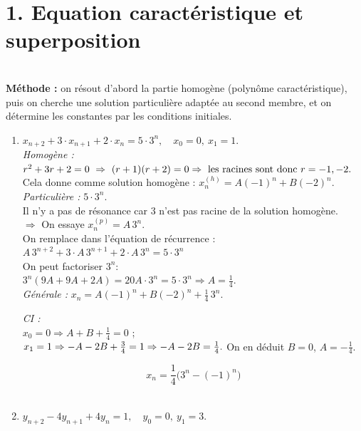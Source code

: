 
\section*{1. Equation caractéristique et superposition}

\begin{solution}
\textbf{ } \\
\textbf{Méthode :} on résout d’abord la partie homogène (polynôme caractéristique), puis on cherche une solution particulière adaptée au second membre, et on détermine les constantes par les conditions initiales.

\begin{enumerate}
\item $\displaystyle x_{n+2}+3 \cdot x_{n+1}+2 \cdot x_n=5\cdot 3^n,\quad x_0=0,\ x_1=1.$ \\

\textit{Homogène :} $r^2+3r+2=0\ \Rightarrow\ (r+1)(r+2)=0\ \\
\Rightarrow\ \text{les racines sont donc } r=-1,-2.$  \\
Cela donne comme solution homogène : $\displaystyle x_n^{(h)}=A(-1)^n+B(-2)^n.$ \\

\textit{Particulière :} $5\cdot 3^n$. \\
Il n'y a pas de résonance car $3$ n’est pas racine de la solution homogène. \\
$\Rightarrow$ On essaye $x_n^{(p)}=A\,3^n$. \\
On remplace dans l'équation de récurrence : $A\,3^{n+2}+3 \cdot A\,3^{n+1}+2 \cdot A\,3^n=5\cdot 3^n$ \\
On peut factoriser $3^n$: \\
$3^{n}(9A+9A+2A)=20A\cdot 3^n=5\cdot 3^n \Rightarrow A=\tfrac14.$ \\

\textit{Générale :} $\displaystyle x_n=A(-1)^n+B(-2)^n+\frac{1}{4}\,3^n.$

\textit{CI :} \\
$x_0=0 \Rightarrow A+B+\tfrac14=0$ ; \\
$x_1=1 \Rightarrow -A-2B+\tfrac34=1 \\
\Rightarrow -A-2B=\tfrac14.$  
On en déduit $B=0$, $A=-\tfrac14$.

\[
\boxed{\,x_n=\frac14\big(3^n-(-1)^n\big)\,}
\] \\

\item $\displaystyle y_{n+2}-4y_{n+1}+4y_n=1,\quad y_0=0,\ y_1=3.$ \\


\end{enumerate}
\end{solution}
